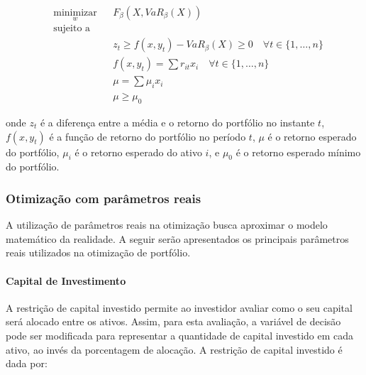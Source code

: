                     \begin{equation}
                        \label{eq:CVaR_obj}
                        \begin{aligned}
                            & \underset{w}{\text{minimizar}}
                            & & F_{\beta}(X,VaR_{\beta}(X)) \\
                            & \text{sujeito a} \\
                            & & & z_{t} \geq f(x,y_{t})-VaR_{\beta}(X) \geq 0 \quad \forall t \in \{1, \ldots, n\} \\
                            & & & f(x,y_{t}) = \sum r_{it} x_{i}   \quad \forall t \in \{1, \ldots, n\} \\
                            & & & \mu = \sum \mu_{i} x_{i} \\
                            & & & \mu \geq \mu_0
                        \end{aligned}
                    \end{equation}

                    \noindent onde $z_{t}$ é a diferença entre a média e o retorno do portfólio no instante $t$, $f(x,y_{t})$ é a função de retorno do portfólio no período $t$, $\mu$ é o retorno esperado do portfólio, $\mu_{i}$ é o retorno esperado do ativo $i$, e $\mu_0$ é o retorno esperado mínimo do portfólio.

            \subsubsection{Otimização com parâmetros reais}

                \ipar A utilização de parâmetros reais na otimização busca aproximar o modelo matemático da realidade. A seguir serão apresentados os principais parâmetros reais utilizados na otimização de portfólio.

                \paragraph{Capital de Investimento}
                
                    \ipar A restrição de capital investido permite ao investidor avaliar como o seu capital será alocado entre os ativos. Assim, para esta avaliação, a variável de decisão pode ser modificada para representar a quantidade de capital investido em cada ativo, ao invés da porcentagem de alocação. A restrição de capital investido é dada por:

